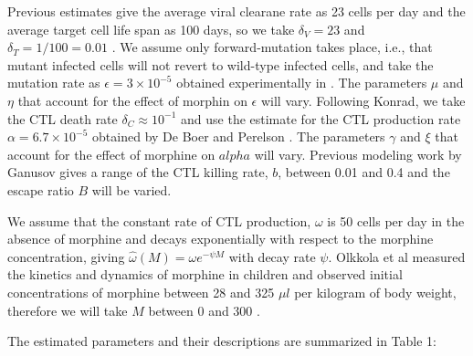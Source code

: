 \documentclass[11pt, oneside]{article}    %
\begin{document}
\vspace{5mm}

	Previous estimates give the average viral clearane rate as 23 cells per day and the average target cell life span as 100 days, so we take $\delta_V = 23$ and $\delta_T = 1/100 = 0.01$ \cite{Ramratnam, Stafford}. We assume only forward-mutation takes place, i.e., that mutant infected cells will not revert to wild-type infected cells, and take the mutation rate as $\epsilon = 3 \times 10^{-5}$ obtained experimentally in \cite{Mansky}. The parameters  $\mu$ and $\eta$ that account for the effect of morphin on $\epsilon$ will vary. Following Konrad, we take the CTL death rate $\delta_C \approx 10^{-1}$ and use the estimate for the CTL production rate $\alpha = 6.7 \times 10^{-5}$ obtained by De Boer and Perelson \cite{Konrad, De Boer}. The parameters $\gamma$ and $\xi$ that account for the effect of morphine on $alpha$ will vary. Previous modeling work by Ganusov gives a range of the CTL killing rate, $b$, between 0.01 and 0.4 \cite{Ganusov} and the escape ratio $B$ will be varied.

\vspace{5mm}

	We assume that the constant rate of CTL production, $\omega$ is 50 cells per day in the absence of morphine and decays exponentially with respect to the morphine concentration, giving $\hat{\omega}(M) = \omega e^{-\psi M}$ with decay rate $\psi$. Olkkola et al measured the kinetics and dynamics of morphine in children and observed initial concentrations of morphine between 28 and 325 $\mu l$ per kilogram of body weight, therefore we will take $M$ between 0 and 300 \cite{Olkkola}.

\vspace{5mm}

	The estimated parameters and their descriptions are summarized in Table 1:


\end{document}
